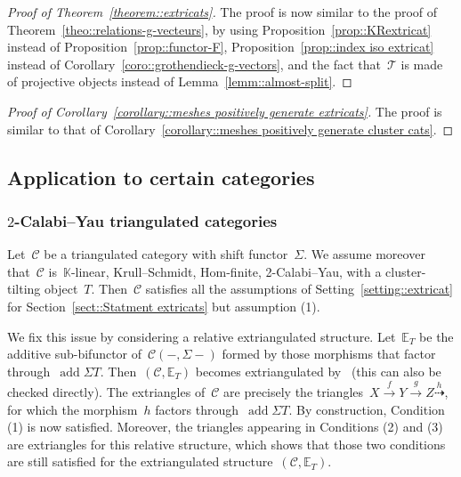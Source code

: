 \documentclass{amsart}
\theoremstyle{definition}
\newcommand{\field}{\mathbb{K}}
\newcommand{\cat}{\mathcal{C}}
\newcommand{\susp}{\Sigma}
\newcommand{\add}{\operatorname{add}}
\newcommand{\tc}{\mathcal{T}}
\begin{document}
\begin{proof}[Proof of Theorem~\ref{theorem::extricats}]
 The proof is now similar to the proof of Theorem~\ref{theo::relations-g-vecteurs}, by using Proposition~\ref{prop::KRextricat} instead of Proposition~\ref{prop::functor-F}, Proposition~\ref{prop::index iso extricat} instead of Corollary~\ref{coro::grothendieck-g-vectors}, and the fact that~$\tc$ is made of projective objects instead of Lemma~\ref{lemm::almost-split}.
\end{proof}

\begin{proof}[Proof of Corollary~\ref{corollary::meshes positively generate extricats}]
The proof is similar to that of Corollary~\ref{corollary::meshes positively generate cluster cats}.
\end{proof}


\subsection{Application to certain categories}

\subsubsection{$2$-Calabi--Yau triangulated categories}\label{sect::2CYTriangulated}

Let~$\cat$ be a triangulated category with shift functor~$\susp$.
We assume moreover that~$\cat$ is~$\field$-linear, Krull--Schmidt, Hom-finite, 2-Calabi--Yau, with a cluster-tilting object~$T$.
Then~$\cat$ satisfies all the assumptions of Setting~\ref{setting::extricat} for Section~\ref{sect::Statment extricats} but assumption (1).

We fix this issue by considering a relative extriangulated structure.
Let~$\mathbb{E}_T$ be the additive sub-bifunctor of~$\cat(-,\susp -)$ formed by those morphisms that factor through~$\add\susp T$.
Then~$(\cat,\mathbb{E}_T)$ becomes extriangulated by~\cite[Proposition 3.14]{HerschendLiuNakaoka} (this can also be checked directly).
The extriangles of~$\cat$ are precisely the triangles~$X\overset{f}{\rightarrow}Y\overset{g}{\rightarrow} Z \overset{h}{\dashrightarrow}$, for which the morphism~$h$ factors through~$\add\susp T$.
By construction, Condition (1) is now satisfied.
Moreover, the triangles appearing in Conditions (2) and (3) are extriangles for this relative structure, which shows that those two conditions are still satisfied for the extriangulated structure~$(\cat,\mathbb{E}_T)$.
\end{document}

